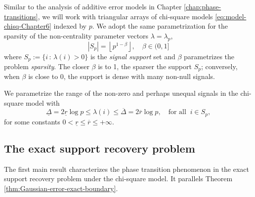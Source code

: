 
Similar to the analysis of additive error models in Chapter \ref{chap:phase-transitions}, we will work with triangular arrays of chi-square models \eqref{eq:model-chisq-Chapter6} indexed by $p$.
We adopt the same parametrization for the sparsity of the non-centrality parameter vectors $\lambda = \lambda_p$,
\begin{equation} \label{eq:signal-sparsity}
    |S_p| = \left\lfloor p^{1-\beta} \right\rfloor, \quad \beta\in(0,1]
\end{equation}
where $S_p:= \{ i\, :\, \lambda(i) >0 \}$ is the {\em signal support} set and  $\beta$ parametrizes the problem {\em sparsity}.  {}
The closer $\beta$ is to 1, the sparser the support $S_p$; conversely, when $\beta$ is close to 0, the support is dense with many non-null signals.

We parametrize the range of the non-zero and perhaps unequal signals in the chi-square model with
\begin{equation} \label{eq:signal-size}
    \underline{\Delta} = 2\underline{r}\log{p}
    \le \lambda(i) \le
    \overline{\Delta} = 2\overline{r}\log{p}, \quad \text{for all}\;\;i\in S_p,
\end{equation}
for some constants $0<\underline{r}\le\overline{r}\le+\infty$.

\subsection{The exact support recovery problem}
\label{subsec:exact-support-recovery-chisq}

The first main result characterizes the phase transition phenomenon in the exact support recovery problem under the chi-square model.  It parallels
Theorem \ref{thm:Gaussian-error-exact-boundary}.

